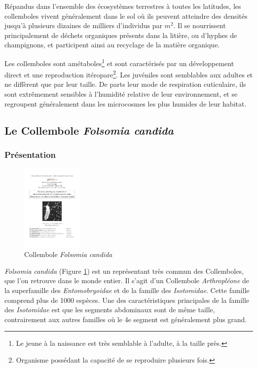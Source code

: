 Répandus dans l'ensemble des écosystèmes terrestres à toutes les latitudes, les
collemboles vivent généralement dans le sol où ils
peuvent atteindre des densités jusqu'à plusieurs dizaines de milliers
d'individus par $m^2$. Il se nourrissent principalement de déchets organiques présents dans
la litière, ou d'hyphes de champignons, et participent ainsi au recyclage de la
matière organique.

Les collemboles sont amétaboles\footnote{Le jeune à la naissance est très
semblable à l'adulte, à la taille près.} et sont caractérisés par un
développement direct et une reproduction itéropare\footnote{Organisme possédant
la capacité de se reproduire plusieurs fois.}. Les juvéniles sont semblables aux
adultes et ne diffèrent que par leur taille.
De parts leur mode de respiration cuticulaire, ils sont extrêmement sensibles à
l'humidité relative de leur environnement, et se regroupent généralement dans
les microcosmes les plus humides de leur habitat. 

\subsection{Le Collembole \textit{Folsomia candida}}

\subsubsection{Présentation}

\begin{figure}[!ht]
\begin{center}
\includegraphics[width=3cm,angle=90]{1_CorpsDeThese/Methodo/folsomiacandida.pdf}
\caption[ Collembole
\textit{Folsomia candida}]{Collembole
\textit{Folsomia candida}}
\label{fig:folsomia}
\end{center}
\end{figure}


\textit{Folsomia candida} (Figure \ref{fig:folsomia}) est un représentant très
commun des Collemboles, que l'on retrouve dans le monde entier. Il s'agit d'un
Collembole \textit{Arthropléone} de la superfamille des \textit{Entomobryoidae}
et de la famille des \textit{Isotomidae}. Cette famille comprend plus de 1000
espèces.
Une des caractéristiques principales de la famille des \textit{Isotomidae} est
que les segments abdominaux sont de même taille, contrairement aux autres
familles où le 4e segment est généralement plus grand.

